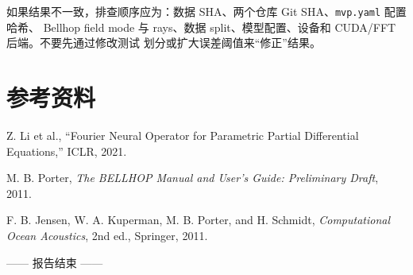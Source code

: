 \documentclass[UTF8,11pt]{ctexart}
\begin{document}
如果结果不一致，排查顺序应为：数据 SHA、两个仓库 Git SHA、\texttt{mvp.yaml} 配置哈希、
Bellhop field mode 与 rays、数据 split、模型配置、设备和 CUDA/FFT 后端。不要先通过修改测试
划分或扩大误差阈值来“修正”结果。

\section{参考资料}

\begin{enumerate}[label={[\arabic*]}]
  \item Z. Li et al., ``Fourier Neural Operator for Parametric Partial Differential Equations,'' ICLR, 2021.
  \item M. B. Porter, \textit{The BELLHOP Manual and User's Guide: Preliminary Draft}, 2011.
  \item F. B. Jensen, W. A. Kuperman, M. B. Porter, and H. Schmidt,
  \textit{Computational Ocean Acoustics}, 2nd ed., Springer, 2011.
\end{enumerate}

\vfill
\begin{center}
\color{gray}\small —— 报告结束 ——
\end{center}
\end{document}
